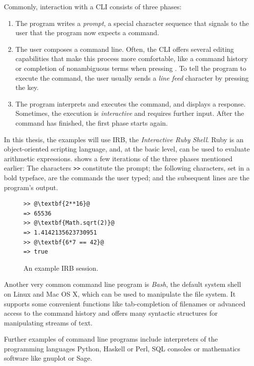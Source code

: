 \documentclass[paper=a4,twoside,abstract=on,cleardoublepage=empty,numbers=noenddot,toc=bib,12pt,appendixprefix=true]{scrreprt}
\begin{document}
Commonly, interaction with a \textsc{CLI} consists of three phases:

\begin{enumerate}
    \item The program writes a \emph{prompt}, a special character sequence that signals to the user that the program now expects a command.
    \item The user composes a command line. Often, the CLI offers several editing capabilities that make this process more comfortable, like a command history or completion of nonambiguous terms when pressing . To tell the program to execute the command, the user usually sends a \emph{line feed} character by pressing the  key.
    \item The program interprets and executes the command, and displays a response. Sometimes, the execution is \emph{interactive} and requires further input. After the command has finished, the first phase starts again.
\end{enumerate}

In this thesis, the examples will use IRB, the \emph{Interactive Ruby Shell}. Ruby is an object-oriented scripting language, and, at the basic level, can be used to evaluate arithmetic expressions.  shows a few iterations of the three phases mentioned earlier: The characters \texttt{>\->} constitute the prompt; the following characters, set in a bold typeface, are the commands the user typed; and the subsequent lines are the program's output.

\begin{figure}[tb]
    \begin{lstlisting}[escapechar=@,frame=shadowbox]
>> @\textbf{2**16}@
=> 65536
>> @\textbf{Math.sqrt(2)}@
=> 1.4142135623730951
>> @\textbf{6*7 == 42}@
=> true
    \end{lstlisting}
    \centering
    \caption{An example IRB session.}
    \label{fig:irb}
\end{figure}

\label{sec:cliexamples}

Another very common command line program is \emph{Bash}, the default system shell on Linux and Mac OS X, which can be used to manipulate the file system. It supports some convenient functions like tab-completion of filenames or advanced access to the command history and offers many syntactic structures for manipulating streams of text.

Further examples of command line programs include interpreters of the programming languages Python, Haskell or Perl, SQL consoles or mathematics software like gnuplot or Sage.
\end{document}

